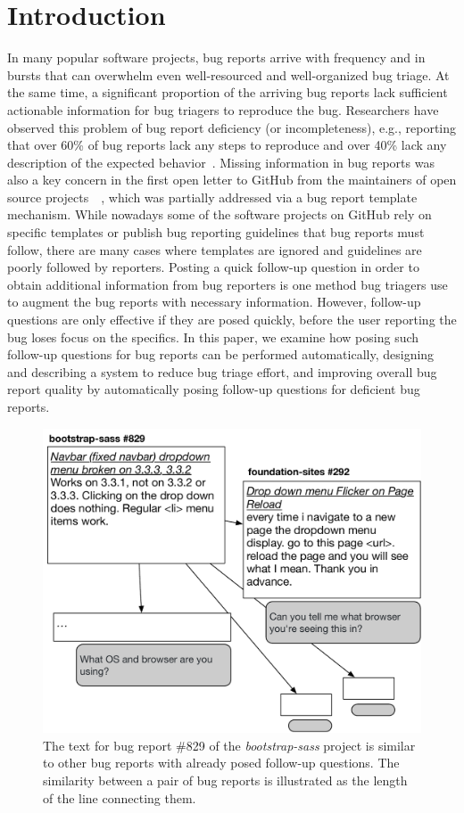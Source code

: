 \section{Introduction}

In many popular software projects, bug reports arrive with frequency and in bursts that can overwhelm even well-resourced and well-organized bug triage.
%
At the same time, a significant proportion of the arriving bug reports lack sufficient actionable information for bug triagers to reproduce the bug.
%
Researchers have observed this problem of bug report deficiency (or incompleteness), e.g., reporting that over 60\% of bug reports lack any steps to reproduce and over 40\% lack any description of the expected behavior~\cite{chaparro17detecting}.
%
Missing information in bug reports was also a key concern in the first open letter to GitHub from the maintainers of open source projects~\cite{deargithub}~\cite{breu2010information}, which was partially addressed via a bug report template mechanism.
%
While nowadays some of the software projects on GitHub rely on specific templates or publish bug reporting guidelines that bug reports must follow, there are many cases where templates are ignored and guidelines are poorly followed by reporters.
%
Posting a quick follow-up question in order to obtain additional information from bug reporters is one method bug triagers use to augment the bug reports with necessary information.
%
However, follow-up questions are only effective if they are posed quickly, before the user reporting the bug loses focus on the specifics.
%
In this paper, we examine how posing such follow-up questions for bug reports can be performed automatically, designing and describing a system to reduce bug triage effort, and improving overall bug report quality by automatically posing follow-up questions for deficient bug reports.

\begin{figure}[t]
\centering
\includegraphics[width=0.95\linewidth]{figures/br_motivation.pdf}
\caption{The text for bug report \#829 of the {\em bootstrap-sass} project is similar to other bug reports with already posed follow-up questions. The similarity between a pair of bug reports is illustrated as the length of the line connecting them.}
\label{fig:motivation}
\end{figure}

